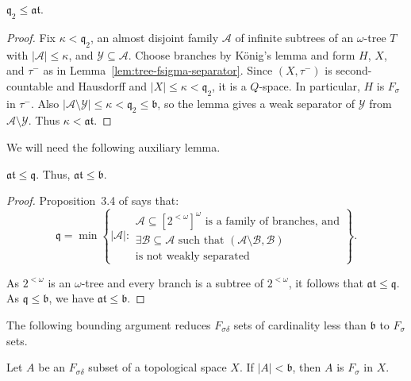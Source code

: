 \begin{proposition}\label{prop:q2-below-at}
$\mathfrak q_2\leq \mathfrak{at}$.
\end{proposition}
\begin{proof}
Fix $\kappa<\mathfrak q_2$, an almost disjoint family $\mathcal A$ of
infinite subtrees of an $\omega$-tree $T$ with $|\mathcal A|\leq\kappa$,
and $\mathcal Y\subseteq\mathcal A$.
Choose branches by König's lemma and form $H$, $X$, and $\tau^-$ as in
Lemma~\ref{lem:tree-fsigma-separator}.
Since $(X,\tau^-)$ is second-countable and Hausdorff and
$|X|\leq\kappa<\mathfrak q_2$, it is a $Q$-space. In particular, $H$
is $F_\sigma$ in $\tau^-$.
Also $|\mathcal A\setminus\mathcal Y|\leq\kappa<\mathfrak q_2\leq\mathfrak b$,
so the lemma gives a weak separator of $\mathcal Y$ from
$\mathcal A\setminus\mathcal Y$. Thus $\kappa<\mathfrak{at}$.
\end{proof}

We will need the following auxiliary lemma.
\begin{lemma}\label{prop:at-le-b}
  $\mathfrak{at}\leq \mathfrak q$.
  Thus, $\mathfrak{at}\leq \mathfrak b$.
\end{lemma}
\begin{proof}
  Proposition~3.4 of \cite{brendle1999dow} says that:
  \[
    \mathfrak q = \min\left\{|\mathcal A|:
    \begin{array}{l}
      \mathcal A\subseteq [2^{<\omega}]^\omega\text{ is a family of branches, and}\\
      \exists\mathcal B\subseteq\mathcal A\text{ such that }(\mathcal A\setminus\mathcal B,\mathcal B)\\
      \text{is not weakly separated}
    \end{array}\right\}.
  \]

  As $2^{<\omega}$ is an $\omega$-tree and every branch is a subtree of $2^{<\omega}$, it follows that $\mathfrak{at}\leq \mathfrak q$.
  As $\mathfrak q\leq \mathfrak b$, we have $\mathfrak{at}\leq \mathfrak b$.
\end{proof}

The following bounding argument reduces $F_{\sigma\delta}$ sets of
cardinality less than $\mathfrak b$ to $F_\sigma$ sets.

\begin{lemma}\label{lem:diagonal-collapse}
Let $A$ be an $F_{\sigma\delta}$ subset of a topological space $X$.
If $|A|<\mathfrak b$, then $A$ is $F_\sigma$ in $X$.
\end{lemma}

